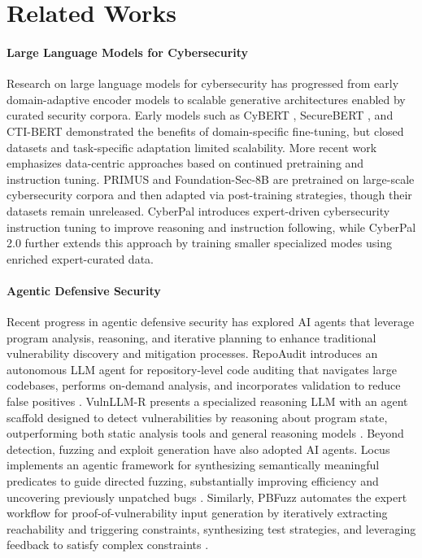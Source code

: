 \documentclass{article}
\theoremstyle{plain}
\theoremstyle{definition}
\theoremstyle{remark}
\begin{document}
\section{Related Works}

\paragraph{Large Language Models for Cybersecurity} Research on large language models for cybersecurity has progressed from early domain-adaptive encoder models to scalable generative architectures enabled by curated security corpora. Early models such as CyBERT \citep{ranade2021cybert}, SecureBERT \citep{aghaei2022securebert}, and CTI-BERT \citep{park2023pretrained} demonstrated the benefits of domain-specific fine-tuning, but closed datasets and task-specific adaptation limited scalability. More recent work emphasizes data-centric approaches based on continued pretraining and instruction tuning. PRIMUS \citep{yu2025primus} and Foundation-Sec-8B \citep{kassianik2025llama} are pretrained on large-scale cybersecurity corpora and then adapted via post-training strategies, though their datasets remain unreleased. CyberPal \citep{levi2025cyberpal} introduces expert-driven cybersecurity instruction tuning to improve reasoning and instruction following, while CyberPal 2.0 \citep{levi2025toward} further extends this approach by training smaller specialized modes using enriched expert-curated data.


\paragraph{Agentic Defensive Security}
Recent progress in agentic defensive security has explored AI agents that leverage program analysis, reasoning, and iterative planning to enhance traditional vulnerability discovery and mitigation processes. RepoAudit introduces an autonomous LLM agent for repository-level code auditing that navigates large codebases, performs on-demand analysis, and incorporates validation to reduce false positives \citep{guorepoaudit}. VulnLLM-R presents a specialized reasoning LLM with an agent scaffold designed to detect vulnerabilities by reasoning about program state, outperforming both static analysis tools and general reasoning models \citep{nie2025vulnllm}. Beyond detection, fuzzing and exploit generation have also adopted AI agents. Locus implements an agentic framework for synthesizing semantically meaningful predicates to guide directed fuzzing, substantially improving efficiency and uncovering previously unpatched bugs \citep{zhu2025locus}. Similarly, PBFuzz automates the expert workflow for proof-of-vulnerability input generation by iteratively extracting reachability and triggering constraints, synthesizing test strategies, and leveraging feedback to satisfy complex constraints \citep{zeng2025pbfuzz}.
\end{document}
